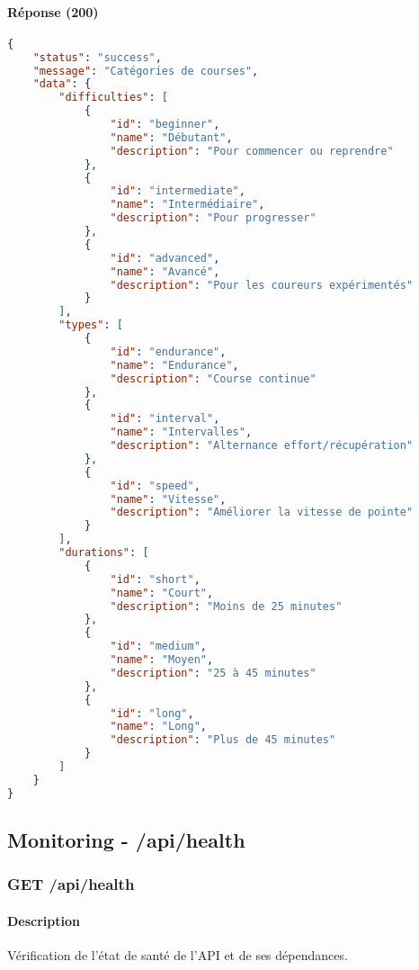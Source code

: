 \paragraph{Réponse (200)}
\begin{lstlisting}[language=json]
{
    "status": "success",
    "message": "Catégories de courses",
    "data": {
        "difficulties": [
            {
                "id": "beginner",
                "name": "Débutant",
                "description": "Pour commencer ou reprendre"
            },
            {
                "id": "intermediate",
                "name": "Intermédiaire",
                "description": "Pour progresser"
            },
            {
                "id": "advanced",
                "name": "Avancé",
                "description": "Pour les coureurs expérimentés"
            }
        ],
        "types": [
            {
                "id": "endurance",
                "name": "Endurance",
                "description": "Course continue"
            },
            {
                "id": "interval",
                "name": "Intervalles",
                "description": "Alternance effort/récupération"
            },
            {
                "id": "speed",
                "name": "Vitesse",
                "description": "Améliorer la vitesse de pointe"
            }
        ],
        "durations": [
            {
                "id": "short",
                "name": "Court",
                "description": "Moins de 25 minutes"
            },
            {
                "id": "medium",
                "name": "Moyen",
                "description": "25 à 45 minutes"
            },
            {
                "id": "long",
                "name": "Long",
                "description": "Plus de 45 minutes"
            }
        ]
    }
}
\end{lstlisting}

\subsection{Monitoring - /api/health}

\subsubsection{GET /api/health}

\paragraph{Description}
Vérification de l'état de santé de l'API et de ses dépendances.

